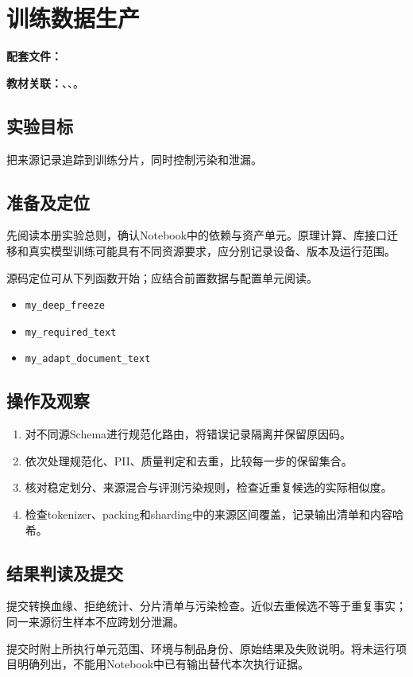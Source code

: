 \chapter{训练数据生产}
\label{lab:A20_data_engineering}

\noindent\textbf{配套文件：}\par
\noindent\textbf{教材关联：}、、。

\section*{实验目标}
把来源记录追踪到训练分片，同时控制污染和泄漏。

\section*{准备及定位}
先阅读本册实验总则，确认Notebook中的依赖与资产单元。原理计算、库接口迁移和真实模型训练可能具有不同资源要求，应分别记录设备、版本及运行范围。

源码定位可从下列函数开始；应结合前置数据与配置单元阅读。
\begin{itemize}
\item \texttt{my\_deep\_freeze}
\item \texttt{my\_required\_text}
\item \texttt{my\_adapt\_document\_text}
\end{itemize}

\section*{操作及观察}
\begin{enumerate}
\item 对不同源Schema进行规范化路由，将错误记录隔离并保留原因码。
\item 依次处理规范化、PII、质量判定和去重，比较每一步的保留集合。
\item 核对稳定划分、来源混合与评测污染规则，检查近重复候选的实际相似度。
\item 检查tokenizer、packing和sharding中的来源区间覆盖，记录输出清单和内容哈希。
\end{enumerate}

\section*{结果判读及提交}
提交转换血缘、拒绝统计、分片清单与污染检查。近似去重候选不等于重复事实；同一来源衍生样本不应跨划分泄漏。

提交时附上所执行单元范围、环境与制品身份、原始结果及失败说明。将未运行项目明确列出，不能用Notebook中已有输出替代本次执行证据。

